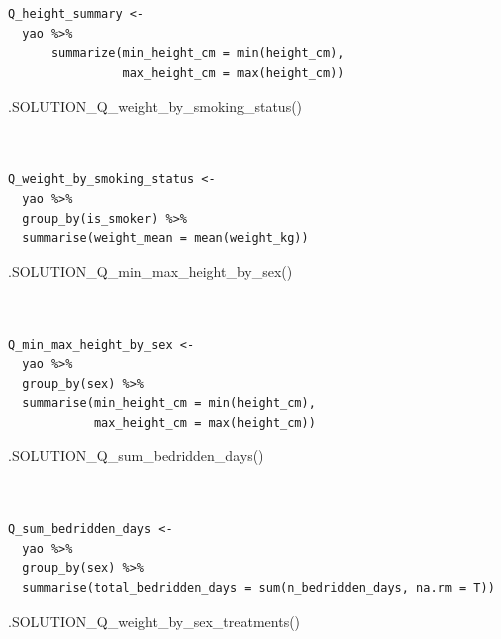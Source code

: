 \documentclass[
  letterpaper,
  DIV=11,
  numbers=noendperiod]{scrreprt}
\newenvironment{Shaded}{\begin{snugshade}}{\end{snugshade}}
\newcommand{\FunctionTok}[1]{\textcolor[rgb]{0.28,0.35,0.67}{#1}}
\newcommand{\NormalTok}[1]{\textcolor[rgb]{0.00,0.23,0.31}{#1}}
\begin{document}
\begin{verbatim}


Q_height_summary <- 
  yao %>%
      summarize(min_height_cm = min(height_cm),
                max_height_cm = max(height_cm))
\end{verbatim}

\begin{Shaded}
\begin{Highlighting}[]
\FunctionTok{.SOLUTION\_Q\_weight\_by\_smoking\_status}\NormalTok{()}
\end{Highlighting}
\end{Shaded}

\begin{verbatim}


Q_weight_by_smoking_status <- 
  yao %>% 
  group_by(is_smoker) %>% 
  summarise(weight_mean = mean(weight_kg))
\end{verbatim}

\begin{Shaded}
\begin{Highlighting}[]
\FunctionTok{.SOLUTION\_Q\_min\_max\_height\_by\_sex}\NormalTok{()}
\end{Highlighting}
\end{Shaded}

\begin{verbatim}


Q_min_max_height_by_sex <- 
  yao %>% 
  group_by(sex) %>%
  summarise(min_height_cm = min(height_cm),
            max_height_cm = max(height_cm))
\end{verbatim}

\begin{Shaded}
\begin{Highlighting}[]
\FunctionTok{.SOLUTION\_Q\_sum\_bedridden\_days}\NormalTok{()}
\end{Highlighting}
\end{Shaded}

\begin{verbatim}


Q_sum_bedridden_days <- 
  yao %>% 
  group_by(sex) %>% 
  summarise(total_bedridden_days = sum(n_bedridden_days, na.rm = T))
\end{verbatim}

\begin{Shaded}
\begin{Highlighting}[]
\FunctionTok{.SOLUTION\_Q\_weight\_by\_sex\_treatments}\NormalTok{()}
\end{Highlighting}
\end{Shaded}
\end{document}

